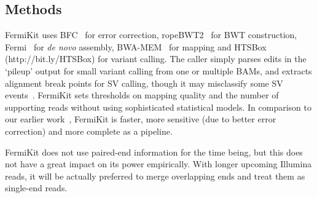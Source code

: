 \documentclass{bioinfo}
\begin{document}
\begin{methods}
\section{Methods}
FermiKit uses BFC~\citep{Li:2015aa-tmp} for error correction,
ropeBWT2~\citep{Li:2014ab} for BWT construction,
Fermi~\citep{Li:2012fk} for {\it de novo} assembly, BWA-MEM~\citep{Li:2013aa}
for mapping and HTSBox (http://bit.ly/HTSBox) for variant calling.
The caller simply parses edits in the `pileup' output for small
variant calling from one or multiple BAMs, and extracts alignment break points
for SV calling, though it may misclassify some SV events~\citep{Trappe:2014fj}. FermiKit sets thresholds on mapping quality and the number of
supporting reads without using sophisticated statistical models.
In comparison to our earlier work~\citep{Li:2012fk}, FermiKit is faster, more
sensitive (due to better error correction) and more complete as a pipeline.

FermiKit does not use paired-end information for the time being, but this does
not have a great impact on its power empirically. With longer upcoming Illumina
reads, it will be actually preferred to merge overlapping ends and treat them
as single-end reads.

\end{methods}
\end{document}
